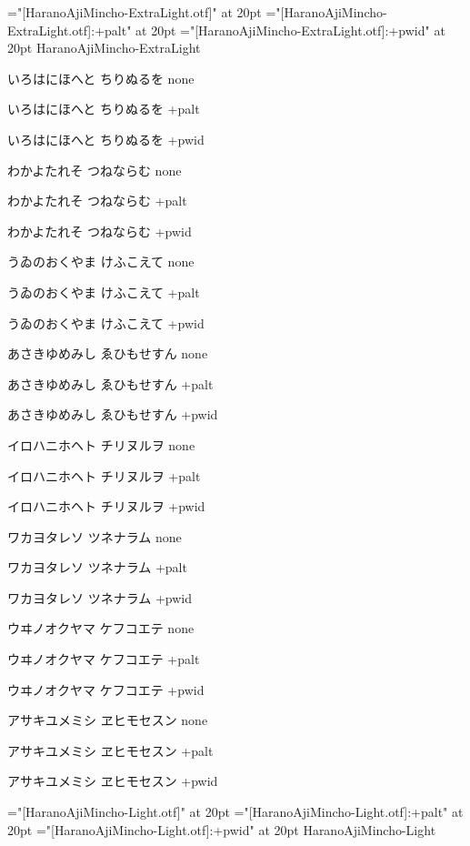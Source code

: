 
\nopagenumbers

\def\test{
\fnone
いろはにほへと
ちりぬるを
none

\fpalt
いろはにほへと
ちりぬるを
+palt

\fpwid
いろはにほへと
ちりぬるを
+pwid


\fnone
わかよたれそ
つねならむ
none

\fpalt
わかよたれそ
つねならむ
+palt

\fpwid
わかよたれそ
つねならむ
+pwid


\fnone
うゐのおくやま
けふこえて
none

\fpalt
うゐのおくやま
けふこえて
+palt

\fpwid
うゐのおくやま
けふこえて
+pwid


\fnone
あさきゆめみし
ゑひもせすん
none

\fpalt
あさきゆめみし
ゑひもせすん
+palt

\fpwid
あさきゆめみし
ゑひもせすん
+pwid


\fnone
イロハニホヘト
チリヌルヲ
none

\fpalt
イロハニホヘト
チリヌルヲ
+palt

\fpwid
イロハニホヘト
チリヌルヲ
+pwid


\fnone
ワカヨタレソ
ツネナラム
none

\fpalt
ワカヨタレソ
ツネナラム
+palt

\fpwid
ワカヨタレソ
ツネナラム
+pwid


\fnone
ウヰノオクヤマ
ケフコエテ
none

\fpalt
ウヰノオクヤマ
ケフコエテ
+palt

\fpwid
ウヰノオクヤマ
ケフコエテ
+pwid


\fnone
アサキユメミシ
ヱヒモセスン
none

\fpalt
アサキユメミシ
ヱヒモセスン
+palt

\fpwid
アサキユメミシ
ヱヒモセスン
+pwid}

\baselineskip=25pt

\font\fnone="[HaranoAjiMincho-ExtraLight.otf]" at 20pt
\font\fpalt="[HaranoAjiMincho-ExtraLight.otf]:+palt" at 20pt
\font\fpwid="[HaranoAjiMincho-ExtraLight.otf]:+pwid" at 20pt
\fnone HaranoAjiMincho-ExtraLight

\test
\vfil
\eject

\font\fnone="[HaranoAjiMincho-Light.otf]" at 20pt
\font\fpalt="[HaranoAjiMincho-Light.otf]:+palt" at 20pt
\font\fpwid="[HaranoAjiMincho-Light.otf]:+pwid" at 20pt
\fnone HaranoAjiMincho-Light

